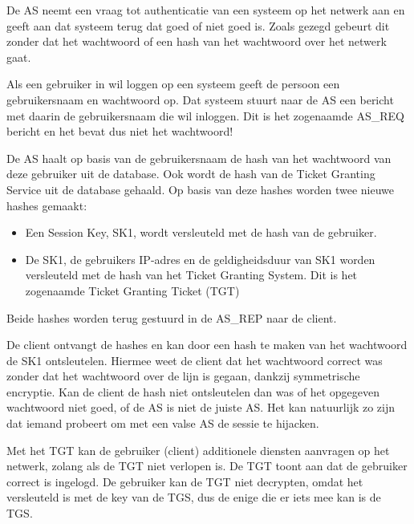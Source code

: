 De AS neemt een vraag tot authenticatie van een systeem op het netwerk aan en geeft aan dat systeem terug dat goed of niet goed is. Zoals gezegd gebeurt dit zonder dat het wachtwoord of een hash van het wachtwoord over het netwerk gaat.

Als een gebruiker in wil loggen op een systeem geeft de persoon een gebruikersnaam en wachtwoord op. Dat systeem stuurt naar de AS een bericht met daarin de gebruikersnaam die wil inloggen. Dit is het zogenaamde AS\_REQ bericht en het bevat dus niet het wachtwoord!

De AS haalt op basis van de gebruikersnaam de hash van het wachtwoord van deze gebruiker uit de database. Ook wordt de hash van de Ticket Granting Service uit de database gehaald. Op basis van deze hashes worden twee nieuwe hashes gemaakt:
\begin{itemize}
	\item Een Session Key, SK1, wordt versleuteld met de hash van de gebruiker.
	\item De SK1, de gebruikers IP-adres en de geldigheidsduur van SK1 worden versleuteld met de hash van het Ticket Granting System. Dit is het zogenaamde Ticket Granting Ticket (TGT)
\end{itemize}
Beide hashes worden terug gestuurd in de AS\_REP naar de client.

De client ontvangt de hashes en kan door een hash te maken van het wachtwoord de SK1 ontsleutelen. Hiermee weet de client dat het wachtwoord correct was zonder dat het wachtwoord over de lijn is gegaan, dankzij symmetrische encryptie. Kan de client de hash niet ontsleutelen dan was of het opgegeven wachtwoord niet goed, of de AS is niet de juiste AS. Het kan natuurlijk zo zijn dat iemand probeert om met een valse AS de sessie te hijacken.

Met het TGT kan de gebruiker (client) additionele diensten aanvragen op het netwerk, zolang als de TGT niet verlopen is. De TGT toont aan dat de gebruiker correct is ingelogd. De gebruiker kan de TGT niet decrypten, omdat het versleuteld is met de key van de TGS, dus de enige die er iets mee kan is de TGS.

